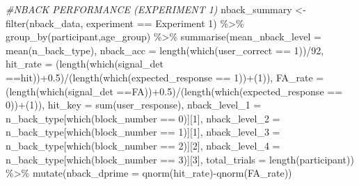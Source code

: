 \documentclass[
]{article}
\newenvironment{Shaded}{\begin{snugshade}}{\end{snugshade}}
\newcommand{\AttributeTok}[1]{\textcolor[rgb]{0.77,0.63,0.00}{#1}}
\newcommand{\CommentTok}[1]{\textcolor[rgb]{0.56,0.35,0.01}{\textit{#1}}}
\newcommand{\DecValTok}[1]{\textcolor[rgb]{0.00,0.00,0.81}{#1}}
\newcommand{\FloatTok}[1]{\textcolor[rgb]{0.00,0.00,0.81}{#1}}
\newcommand{\FunctionTok}[1]{\textcolor[rgb]{0.00,0.00,0.00}{#1}}
\newcommand{\NormalTok}[1]{#1}
\newcommand{\OtherTok}[1]{\textcolor[rgb]{0.56,0.35,0.01}{#1}}
\newcommand{\SpecialCharTok}[1]{\textcolor[rgb]{0.00,0.00,0.00}{#1}}
\newcommand{\StringTok}[1]{\textcolor[rgb]{0.31,0.60,0.02}{#1}}
\begin{document}
\begin{Shaded}
\begin{Highlighting}[]
\CommentTok{\#NBACK PERFORMANCE (EXPERIMENT 1)}
\NormalTok{nback\_summary }\OtherTok{\textless{}{-}} \FunctionTok{filter}\NormalTok{(nback\_data, experiment }\SpecialCharTok{==} \StringTok{\textquotesingle{}Experiment 1\textquotesingle{}}\NormalTok{) }\SpecialCharTok{\%\textgreater{}\%} 
  \FunctionTok{group\_by}\NormalTok{(participant,age\_group) }\SpecialCharTok{\%\textgreater{}\%}
  \FunctionTok{summarise}\NormalTok{(}\AttributeTok{mean\_nback\_level =} \FunctionTok{mean}\NormalTok{(n\_back\_type),}
            \AttributeTok{nback\_acc =} \FunctionTok{length}\NormalTok{(}\FunctionTok{which}\NormalTok{(user\_correct }\SpecialCharTok{==} \DecValTok{1}\NormalTok{))}\SpecialCharTok{/}\DecValTok{92}\NormalTok{,}
            \AttributeTok{hit\_rate =}\NormalTok{ (}\FunctionTok{length}\NormalTok{(}\FunctionTok{which}\NormalTok{(signal\_det }\SpecialCharTok{==}\StringTok{\textquotesingle{}hit\textquotesingle{}}\NormalTok{))}\SpecialCharTok{+}\FloatTok{0.5}\NormalTok{)}\SpecialCharTok{/}\NormalTok{(}\FunctionTok{length}\NormalTok{(}\FunctionTok{which}\NormalTok{(expected\_response }\SpecialCharTok{==} \DecValTok{1}\NormalTok{))}\SpecialCharTok{+}\NormalTok{(}\DecValTok{1}\NormalTok{)),}
            \AttributeTok{FA\_rate =}\NormalTok{ (}\FunctionTok{length}\NormalTok{(}\FunctionTok{which}\NormalTok{(signal\_det }\SpecialCharTok{==}\StringTok{\textquotesingle{}FA\textquotesingle{}}\NormalTok{))}\SpecialCharTok{+}\FloatTok{0.5}\NormalTok{)}\SpecialCharTok{/}\NormalTok{(}\FunctionTok{length}\NormalTok{(}\FunctionTok{which}\NormalTok{(expected\_response }\SpecialCharTok{==} \DecValTok{0}\NormalTok{))}\SpecialCharTok{+}\NormalTok{(}\DecValTok{1}\NormalTok{)),}
            \AttributeTok{hit\_key =} \FunctionTok{sum}\NormalTok{(user\_response),}
            \AttributeTok{nback\_level\_1 =}\NormalTok{ n\_back\_type[}\FunctionTok{which}\NormalTok{(block\_number }\SpecialCharTok{==} \DecValTok{0}\NormalTok{)][}\DecValTok{1}\NormalTok{],}
            \AttributeTok{nback\_level\_2 =}\NormalTok{ n\_back\_type[}\FunctionTok{which}\NormalTok{(block\_number }\SpecialCharTok{==} \DecValTok{1}\NormalTok{)][}\DecValTok{1}\NormalTok{],}
            \AttributeTok{nback\_level\_3 =}\NormalTok{ n\_back\_type[}\FunctionTok{which}\NormalTok{(block\_number }\SpecialCharTok{==} \DecValTok{2}\NormalTok{)][}\DecValTok{2}\NormalTok{],}
            \AttributeTok{nback\_level\_4 =}\NormalTok{ n\_back\_type[}\FunctionTok{which}\NormalTok{(block\_number }\SpecialCharTok{==} \DecValTok{3}\NormalTok{)][}\DecValTok{3}\NormalTok{],}
            \AttributeTok{total\_trials =} \FunctionTok{length}\NormalTok{(participant)) }\SpecialCharTok{\%\textgreater{}\%}
  \FunctionTok{mutate}\NormalTok{(}\AttributeTok{nback\_dprime =} \FunctionTok{qnorm}\NormalTok{(hit\_rate)}\SpecialCharTok{{-}}\FunctionTok{qnorm}\NormalTok{(FA\_rate))}
\end{Highlighting}
\end{Shaded}
\end{document}
